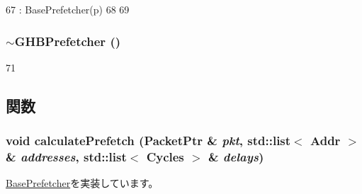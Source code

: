 \begin{DoxyCode}
67         : BasePrefetcher(p)
68     {
69     }
\end{DoxyCode}
\hypertarget{classGHBPrefetcher_aaaf7b424b631ae41cc887bd13ef47451}{
\subsubsection[{$\sim$GHBPrefetcher}]{\setlength{\rightskip}{0pt plus 5cm}$\sim${\bf GHBPrefetcher} ()}}
\label{classGHBPrefetcher_aaaf7b424b631ae41cc887bd13ef47451}



\begin{DoxyCode}
71 {}
\end{DoxyCode}


\subsection{関数}
\hypertarget{classGHBPrefetcher_a1cc3d838a8314074cfda794f18eb6de9}{
\subsubsection[{calculatePrefetch}]{\setlength{\rightskip}{0pt plus 5cm}void calculatePrefetch ({\bf PacketPtr} \& {\em pkt}, \/  {\bf std::list}$<$ {\bf Addr} $>$ \& {\em addresses}, \/  {\bf std::list}$<$ {\bf Cycles} $>$ \& {\em delays})}}
\label{classGHBPrefetcher_a1cc3d838a8314074cfda794f18eb6de9}


\hyperlink{classBasePrefetcher_a3db7131bcae7e87e8146195a6e8be817}{BasePrefetcher}を実装しています。


